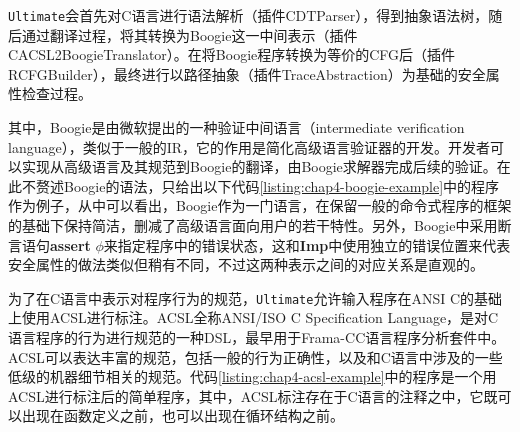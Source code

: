 \texttt{Ultimate}会首先对C语言进行语法解析（插件CDTParser），得到抽象语法树，随后通过翻译过程，将其转换为Boogie这一中间表示（插件CACSL2BoogieTranslator）。在将Boogie程序转换为等价的CFG后（插件RCFGBuilder），最终进行以路径抽象（插件TraceAbstraction）为基础的安全属性检查过程\cite{heizmann_traces_2015}。

其中，Boogie\cite{leino_this_2016}是由微软提出的一种验证中间语言（intermediate verification language），类似于一般的IR，它的作用是简化高级语言验证器的开发。开发者可以实现从高级语言及其规范到Boogie的翻译，由Boogie求解器完成后续的验证。在此不赘述Boogie的语法，只给出以下代码\ref{listing:chap4-boogie-example}中的程序作为例子，从中可以看出，Boogie作为一门语言，在保留一般的命令式程序的框架的基础下保持简洁，删减了高级语言面向用户的若干特性。另外，Boogie中采用断言语句\textbf{assert} $\phi$来指定程序中的错误状态，这和\textbf{Imp}中使用独立的错误位置来代表安全属性的做法类似但稍有不同，不过这两种表示之间的对应关系是直观的。


为了在C语言中表示对程序行为的规范，\texttt{Ultimate}允许输入程序在ANSI C的基础上使用ACSL进行标注。ACSL全称ANSI/ISO C Specification Language，是对C语言程序的行为进行规范的一种DSL，最早用于Frama-C\cite{kirchner_frama-c_2015}C语言程序分析套件中。ACSL可以表达丰富的规范，包括一般的行为正确性，以及和C语言中涉及的一些低级的机器细节相关的规范。代码\ref{listing:chap4-acsl-example}中的程序是一个用ACSL进行标注后的简单程序，其中，ACSL标注存在于C语言的注释之中，它既可以出现在函数定义之前，也可以出现在循环结构之前。


